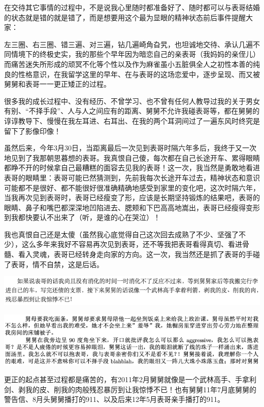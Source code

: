 \documentclass[9pt, b5paper]{article}
\begin{document}
在交待其它事情的过程中，不是说我心里随时都准备好了、随时都可以与表哥结婚的状态就是错的就是错了，而是想要用这个最为显眼的精神状态前后事件提醒大家：

左三圈、右三圈、错三遍、对三遍，钻几遍崎角旮旯，也坦诚地交待、承认几遍不同情境下的终极史实，我的那些个早年因为暗恋自己的亲表哥（我妈妈的亲侄儿）而痛苦迷失所形成的顽冥不化等个性以及作为麻雀虽小五脏俱全人之初性本善的纯良的性格意识，在我留学这里的早年、在与表哥的这场恋爱中，逐步呈现、而又被舅舅和表哥一一更正矮正的过程。

很多我的成长过程中、没有经历、不曾学习、也不曾有任何人教导过我的关于男女有别、“不择手段”、人与人之间应有的距离、舅舅不允许我碰表哥等，都在舅舅的谆谆教导下、慢慢在我左耳进、右耳出、在我的两个耳洞间过了一遍东风时终究是留下了影像印像！

虽然后来，今年3月30日，当距离最后一次见到表哥时隔六年多后，我终于又一次地见到了我那朝思暮想的表哥。我真恨自己傻，每次都在自己长途开车、累得眼睛都睁不开的时候拿自己最糟糕的面容去见我的表哥！这一次，我当然是勇敢地看进表哥的眼睛里：表哥可能已然猜测到，先前我每次长途开车过去，精神状态和意识可能都不是很好、都不能很好很准确精确地感受到家里的变化吧，这次时隔六年，当我再次见到表哥时，表哥已经瘦变了形，应该是长期坚持锻炼的结果吧，表哥的眼睛、鼻子和嘴巴都深深地凹陷进去、腮颊和下巴高高地嵩出，表哥已经瘦得变形到我都快要认不出来了（听，是谁的心在哭泣）！

我也真恨自己还是太傻（虽然我心底觉得自己这次回去成熟了不少、坚强了不少），这么多年来我好不容易再次见到表哥，还不等我把表哥看得真切、看进骨髓、看入灵魂，表哥已经转身走向家的方向。这一次，我当然还是抓了表哥的手碰了表哥，情不自禁，这是后话。

\begin{center}
\includegraphics[width=.9\linewidth]{./pic/pfp36.png}
\end{center}

\begin{center}
\includegraphics[width=.9\linewidth]{./pic/p1p51-4.png}
\end{center}

更正的起点甚至过程都是痛苦的，有2011年2月舅舅就像是一个武林高手、手拿利剑、剥我的皮、削我的肉般残忍暴厉到让我惊悸不已！也有舅舅11年7月底舅舅的警告信、8月头舅舅播打的911、以及后来12年5月表哥亲手播打的911。
\end{document}
